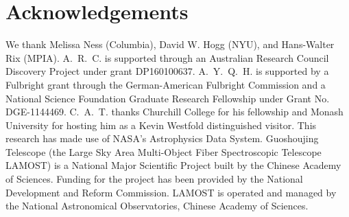 \documentclass[a4paper,fleqn,usenatbib]{mnras}
\newcommand{\project}[1]{#1}
\newcommand{\lamost}{\project{LAMOST}}
\begin{document}




\section*{Acknowledgements}
We thank Melissa Ness (Columbia), David W. Hogg (NYU), and Hans-Walter Rix (MPIA).
A.~R.~C. is supported through an Australian Research Council Discovery Project under grant DP160100637.
A.~Y.~Q.~H. is supported by a Fulbright grant through the German-American Fulbright Commission and a National Science Foundation Graduate Research Fellowship under Grant No. DGE-1144469. 
C.~A.~T. thanks Churchill College for his fellowship and Monash University for hosting him as a Kevin Westfold distinguished visitor.
This research has made use of NASA's Astrophysics Data System.
Guoshoujing Telescope (the Large Sky Area Multi-Object Fiber Spectroscopic Telescope LAMOST) is a National Major Scientific Project built by the Chinese Academy of Sciences. Funding for the project has been provided by the National Development and Reform Commission. LAMOST is operated and managed by the National Astronomical Observatories, Chinese Academy of Sciences.









\bsp	%
\label{lastpage}
\end{document}
